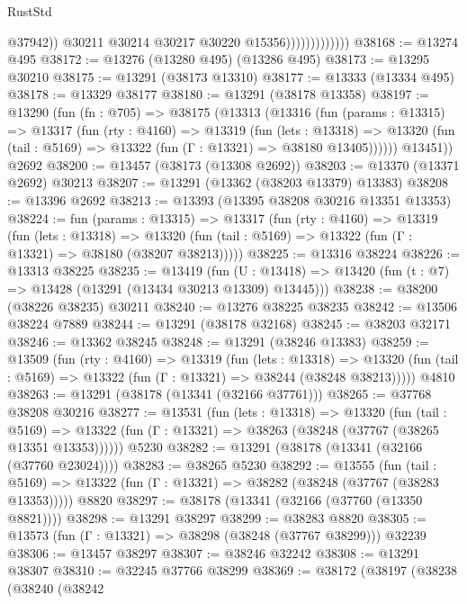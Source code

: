 \begin{lexlean}{RustStd}
\begin{coremodule}
                                  @37942))
                              @30211
                              @30214
                              @30217
                              @30220
                              @15356)))))))))))))
@38168 := @13274 @495
@38172 := @13276 (@13280 @495) (@13286 @495)
@38173 := @13295 @30210
@38175 := @13291 (@38173 @13310)
@38177 := @13333 (@13334 @495)
@38178 := @13329 @38177
@38180 := @13291 (@38178 @13358)
@38197 := @13290
    (fun (fn : @705) =>
    @38175
      (@13313
        (@13316
          (fun (params : @13315) =>
          @13317
            (fun (rty : @4160) =>
            @13319
              (fun (lets : @13318) =>
              @13320 (fun (tail : @5169) => @13322 (fun (Γ : @13321) => @38180 @13405))))))
        @13451))
    @2692
@38200 := @13457 (@38173 (@13308 @2692))
@38203 := @13370 (@13371 @2692) @30213
@38207 := @13291 (@13362 (@38203 @13379) @13383)
@38208 := @13396 @2692
@38213 := @13393 (@13395 @38208 @30216 @13351 @13353)
@38224 := fun (params : @13315) =>
  @13317
    (fun (rty : @4160) =>
    @13319
      (fun (lets : @13318) =>
      @13320 (fun (tail : @5169) => @13322 (fun (Γ : @13321) => @38180 (@38207 @38213)))))
@38225 := @13316 @38224
@38226 := @13313 @38225
@38235 := @13419
    (fun (U : @13418) => @13420 (fun (t : @7) => @13428 (@13291 (@13434 @30213 @13309) @13445)))
@38238 := @38200 (@38226 @38235) @30211
@38240 := @13276 @38225 @38235
@38242 := @13506 @38224 @7889
@38244 := @13291 (@38178 @32168)
@38245 := @38203 @32171
@38246 := @13362 @38245
@38248 := @13291 (@38246 @13383)
@38259 := @13509
    (fun (rty : @4160) =>
    @13319
      (fun (lets : @13318) =>
      @13320 (fun (tail : @5169) => @13322 (fun (Γ : @13321) => @38244 (@38248 @38213)))))
    @4810
@38263 := @13291 (@38178 (@13341 (@32166 @37761)))
@38265 := @37768 @38208 @30216
@38277 := @13531
    (fun (lets : @13318) =>
    @13320
      (fun (tail : @5169) =>
      @13322 (fun (Γ : @13321) => @38263 (@38248 (@37767 (@38265 @13351 @13353))))))
    @5230
@38282 := @13291 (@38178 (@13341 (@32166 (@37760 @23024))))
@38283 := @38265 @5230
@38292 := @13555
    (fun (tail : @5169) => @13322 (fun (Γ : @13321) => @38282 (@38248 (@37767 (@38283 @13353)))))
    @8820
@38297 := @38178 (@13341 (@32166 (@37760 (@13350 @8821))))
@38298 := @13291 @38297
@38299 := @38283 @8820
@38305 := @13573 (fun (Γ : @13321) => @38298 (@38248 (@37767 @38299))) @32239
@38306 := @13457 @38297
@38307 := @38246 @32242
@38308 := @13291 @38307
@38310 := @32245 @37766 @38299
@38369 := @38172
    (@38197
      (@38238
        (@38240
          (@38242

\end{coremodule}
\end{lexlean}
